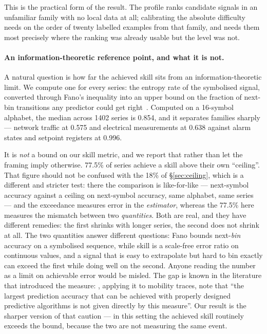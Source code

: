\documentclass[11pt,a4paper]{article}
\newcommand{\num}[1]{#1}
\begin{document}
This is the practical form of the result. The profile ranks candidate signals in
an unfamiliar family with no local data at all; calibrating the absolute
difficulty needs on the order of twenty labelled examples from that family, and
needs them most precisely where the ranking was already usable but the level was
not.

\paragraph{An information-theoretic reference point, and what it is not.} A
natural question is how far the achieved skill sits from an information-theoretic
limit. We compute one for every series: the entropy rate of the symbolised
signal, converted through Fano's inequality into an upper bound on the fraction
of next-bin transitions any predictor could get right~\citep{song2010limits}. Computed on a 16-symbol alphabet, the median across
\num{1402} series is \num{0.854}, and it separates families sharply --- network
traffic at \num{0.575} and electrical measurements at \num{0.638} against alarm
states and setpoint registers at \num{0.996}.

It is \emph{not} a bound on our skill metric, and we report that rather than
let the framing imply otherwise. \num{77.5}\% of series achieve a skill above
their own ``ceiling''. That figure should not be confused with the \num{18}\%
of \S\ref{sec:ceiling}, which is a different and stricter test: there the
comparison is like-for-like --- next-symbol accuracy against a ceiling on
next-symbol accuracy, same alphabet, same series --- and the exceedance measures
error in the \emph{estimator}, whereas the \num{77.5}\% here measures the
mismatch between two \emph{quantities}. Both are real, and they have different
remedies: the first shrinks with longer series, the second does not shrink at
all. The two quantities answer different questions: Fano
bounds next-\emph{bin} accuracy on a symbolised sequence, while skill is a
scale-free error ratio on continuous values, and a signal that is easy to
extrapolate but hard to bin exactly can exceed the first while doing well on the
second. Anyone reading the number as a limit on achievable error would be
misled. The gap is known in the literature that introduced the measure:
\citet{lu2013approaching}, applying it to mobility traces, note that ``the
largest prediction accuracy that can be achieved with properly designed
predictive algorithms is not given directly by this measure''. Our result is
the sharper version of that caution --- in this setting the achieved skill
routinely exceeds the bound, because the two are not measuring the same event.
\end{document}
